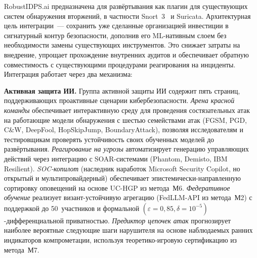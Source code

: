 
\label{sec:deployment}%

RobustIDPS.ai предназначена для развёртывания как плагин для существующих систем обнаружения вторжений, в частности Snort~3~\cite{Roesch1999} и Suricata. Архитектурная цель интеграции~--- сохранить уже сделанные организацией инвестиции в сигнатурный контур безопасности, дополнив его ML-нативным слоем без необходимости замены существующих инструментов. Это снижает затраты на внедрение, упрощает прохождение внутренних аудитов и обеспечивает обратную совместимость с существующими процедурами реагирования на инциденты. Интеграция работает через два механизма:

\noindent\textbf{Активная защита ИИ.} Группа активной защиты ИИ
содержит пять страниц, поддерживающих проактивные сценарии
кибербезопасности. \emph{Арена красной команды} обеспечивает
интерактивную среду для проведения состязательных атак на
работающие модели обнаружения с шестью семействами атак (FGSM,
PGD, C\&W, DeepFool, HopSkipJump, BoundaryAttack), позволяя
исследователям и тестировщикам проверять устойчивость своих
обученных моделей до развёртывания. \emph{Реагирование на угрозы}
автоматизирует генерацию управляющих действий через интеграцию
с SOAR-системами (Phantom, Demisto, IBM Resilient).
\emph{SOC-копилот} (наследник наработок Microsoft Security Copilot,
но открытый и мультипровайдерный) обеспечивает
эпистемически-направленную сортировку оповещений на основе UC-HGP
из метода~М6. \emph{Федеративное обучение} реализует
визант-устойчивую агрегацию (FedLLM-API из метода~М2) с
поддержкой до 50~участников и формальной
$(\varepsilon{=}0{,}85,\delta{=}10^{-5})$-дифференциальной
приватностью. \emph{Предиктор цепочек атак} прогнозирует
наиболее вероятные следующие шаги нарушителя на основе
наблюдаемых ранних индикаторов компрометации, используя
теоретико-игровую сертификацию из метода~М7.

